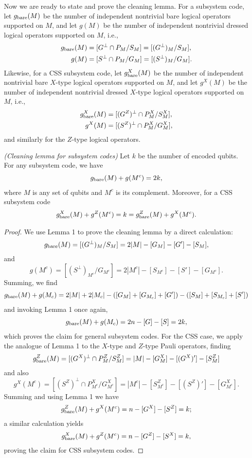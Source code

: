 Now we are ready to state and prove the cleaning lemma. For a subsystem code, let $g_{\rm bare}(M)$ be the number of independent nontrivial bare logical operators supported on $M$, and let $g(M)$ be the number of independent nontrivial dressed logical operators supported on $M$, i.e.,
\begin{align*}
 g_{\rm bare}(M) &= [G^\perp \cap P_M / S_M ] = [(G^\perp)_M/S_M], \\
 g(M)        &= [S^\perp \cap P_M / G_M ]= [(S^\perp)_M/G_M].
\end{align*}
Likewise, for a CSS subsystem code, let $g_{\rm bare}^X(M)$ be the number of independent nontrivial bare $X$-type logical operators supported on $M$, and let $g^X(M)$ be the number of independent nontrivial dressed $X$-type logical operators supported on $M$, i.e.,
\begin{align*}
 g_{\rm bare}^X(M) &= [(G^Z)^\perp \cap P^X_M / S^X_M], \\
 g^X(M)        &= [(S^Z)^\perp \cap P^X_M / G^X_M],
\end{align*}
and similarly for the $Z$-type logical operators.

\begin{lem}\emph{(Cleaning lemma for subsystem codes)}
Let $k$ be the number of encoded qubits.
For any subsystem code, we have
\[
 g_{\rm bare}(M) + g(M^c) = 2k ,
\]
where $M$ is any set of qubits and $M^c$ is its complement. 
Moreover, for a CSS subsystem code
\[
g_{\rm bare}^X(M) + g^Z(M^c) = k = g_{\rm bare}^Z(M) + g^X(M^c).
\]
\label{lem:counting_op}
\end{lem}
\begin{proof}
We use Lemma 1 to prove the cleaning lemma by a direct calculation:
\[
g_{\rm bare}(M) = [(G^\perp)_M  / S_M] = 2|M| - [G_M] - [G'] - [S_M] ,
\]
and
\[
g(M^c) = [(S^\perp)_{M^c} / G_{M^c}] = 2|M^c| - [S_{M^c}] - [S'] - [G_{M^c}] .
\]
Summing, we find
\[
g_{\rm bare}(M) + g(M_c) = 2|M| + 2|M_c| -([G_M] + [G_{M_c}] + [G']) -([S_M] + [S_{M_c}] + [S'])
\]
and invoking Lemma 1 once again,
\[
g_{\rm bare}(M) + g(M_c) = 2n -[G] - [S] = 2k ,
\]
which proves the claim for general subsystem codes.
For the CSS case, we apply the analogue of Lemma 1 to the $X$-type and $Z$-type Pauli operators, finding
\[
g^Z_{\rm bare}(M) = [ (G^X)^\perp \cap P^Z_{M} / S^Z_{M} ] = |M| - [G^X_{M}] - [(G^X)'] - [S^Z_{M}]
\]
and also 
\[
g^X(M^c) = [ (S^Z)^\perp \cap P^X_{M^c} / G^X_{M^c} ] = |M^c| - [S^Z_{M^c}] - [(S^Z)'] - [G^X_{M^c}]. 
\]
Summing and using Lemma 1 we have
\[
g_{\rm bare}^Z(M) + g^X(M^c) = n - [G^X]-[S^Z] =k ;
\]
a similar calculation yields 
\[
g_{\rm bare}^X(M) + g^Z(M^c) = n - [G^Z]-[S^X] =k ,
\]
proving the claim for CSS subsystem codes.
\end{proof}

